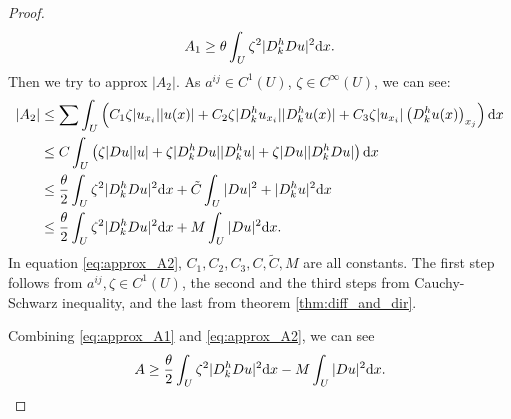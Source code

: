 \begin{proof}
    \begin{equation}
        \label{eq:approx_A1}
        A_{1}\ge \theta\int_{U}\zeta^{2}|D_{k}^{h}Du|^{2}\mathrm{d} x.
    \end{equation}
    Then we try to approx $|A_{2}|$. As $a^{ij}\in C^{1}(U)$, $\zeta\in C^{\infty}(U)$, we can see:
    \begin{equation}
        \label{eq:approx_A2}
        \begin{aligned}
            |A_{2}|&\le \sum\int_{U}\left(C_{1}\zeta|u_{x_{i}}||u(x)|+C_{2}\zeta|D_{k}^{h}u_{x_{i}}||D_{k}^{h}u(x)|+C_{3}\zeta|u_{x_{i}}|\left(D_{k}^{h}u(x)\right)_{x_{j}}\right)\mathrm{d} x\\
            &\le C\int_{U}\left(\zeta|Du||u|+\zeta|D_{k}^{h}Du||D_{k}^{h}u|+\zeta|Du||D_{k}^{h}Du|\right)\mathrm{d} x\\
            &\le \frac{\theta}{2} \int_{U}\zeta^{2}|D_{k}^{h}Du|^{2}\mathrm{d} x+\tilde{C}\int_{U}|Du|^{2}+|D_{k}^{h}u|^{2}\mathrm{d} x\\
            &\le\frac{\theta}{2}\int_{U}\zeta^{2}|D_{k}^{h}Du|^{2}\mathrm{d} x+M\int_{U}|Du|^{2}\mathrm{d} x.
        \end{aligned}
    \end{equation}
    In equation \eqref{eq:approx_A2}, $C_{1},C_{2},C_{3},C,\tilde{C},M$ are all constants. The first step follows from $a^{ij},\zeta\in C^{1}(U)$, the second and the third steps from Cauchy-Schwarz inequality, and the last from theorem \ref{thm:diff_and_dir}.

    Combining \eqref{eq:approx_A1} and \eqref{eq:approx_A2}, we can see 
    \begin{equation}
        \label{eq:approx_A}
        A\ge \frac{\theta}{2}\int_{U}\zeta^{2}|D_{k}^{h}Du|^{2}\mathrm{d} x-M\int_{U}|Du|^{2}\mathrm{d} x.
    \end{equation}


\end{proof}
